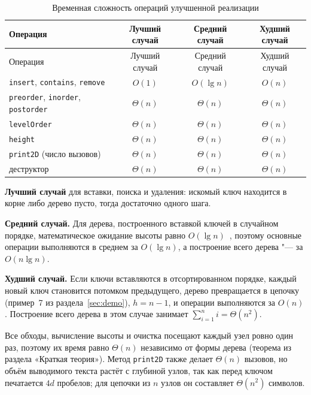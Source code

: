 \documentclass[otchet]{SCWorks}
\begin{document}
\begin{longtable}{|p{}|c|c|c|}
  \caption{Временная сложность операций улучшенной реализации}
  \label{tab:time} \\
  \hline
  Операция & Лучший случай & Средний случай & Худший случай \\ \hline
  \endfirsthead
  \hline
  Операция & Лучший случай & Средний случай & Худший случай \\ \hline
  \endhead
  \texttt{insert}, \texttt{contains}, \texttt{remove} &
      $O(1)$ & $O(\lg n)$ & $O(n)$ \\ \hline
  \texttt{preorder}, \texttt{inorder}, \texttt{postorder} &
      $\Theta(n)$ & $\Theta(n)$ & $\Theta(n)$ \\ \hline
  \texttt{levelOrder} & $\Theta(n)$ & $\Theta(n)$ & $\Theta(n)$ \\ \hline
  \texttt{height} & $\Theta(n)$ & $\Theta(n)$ & $\Theta(n)$ \\ \hline
  \texttt{print2D} (число вызовов) & $\Theta(n)$ & $\Theta(n)$ & $\Theta(n)$ \\ \hline
  деструктор & $\Theta(n)$ & $\Theta(n)$ & $\Theta(n)$ \\ \hline
\end{longtable}

\textbf{Лучший случай} для вставки, поиска и удаления: искомый ключ
находится в корне либо дерево пусто, тогда достаточно одного шага.

\textbf{Средний случай.} Для дерева, построенного вставкой ключей в
случайном порядке, математическое ожидание высоты равно
$O(\lg n)$~\cite{kormen}, поэтому основные операции выполняются в
среднем за $O(\lg n)$, а построение всего дерева "--- за $O(n \lg n)$.

\textbf{Худший случай.} Если ключи вставляются в отсортированном порядке,
каждый новый ключ становится потомком предыдущего, дерево превращается в
цепочку (пример~7 из раздела~\ref{sec:demo}), $h = n-1$, и операции
выполняются за $O(n)$. Построение всего дерева в этом случае занимает
$\sum_{i=1}^{n} i = \Theta(n^2)$.

Все обходы, вычисление высоты и очистка посещают каждый узел ровно один
раз, поэтому их время равно $\Theta(n)$ независимо от формы дерева
(теорема из раздела «Краткая теория»). Метод \texttt{print2D} также делает $\Theta(n)$
вызовов, но объём выводимого текста растёт с глубиной узлов, так как
перед ключом печатается $4d$ пробелов; для цепочки из $n$ узлов он
составляет $\Theta(n^2)$ символов.
\end{document}
